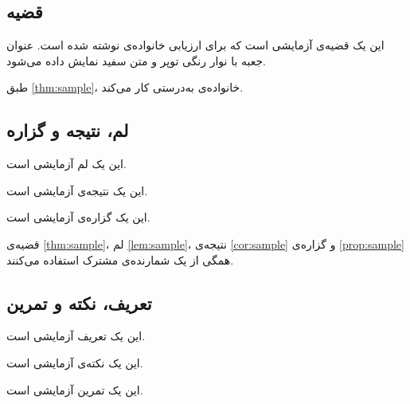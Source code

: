 \documentclass{matinbook}
\begin{document}
\subsection{قضیه}

\begin{theorem}
    این یک قضیه‌ی آزمایشی است که برای ارزیابی خانواده‌ی
     نوشته شده است. عنوان جعبه با نوار رنگی
    توپر و متن سفید نمایش داده می‌شود.
    \label{thm:sample}
\end{theorem}

طبق \cref{thm:sample}، خانواده‌ی  به‌درستی کار می‌کند.

\subsection{لم، نتیجه و گزاره}

\begin{lemma}[لم نمونه]
    این یک لم آزمایشی است.
    \label{lem:sample}
\end{lemma}

\begin{corollary}
    این یک نتیجه‌ی آزمایشی است.
    \label{cor:sample}
\end{corollary}

\begin{proposition}
    این یک گزاره‌ی آزمایشی است.
    \label{prop:sample}
\end{proposition}

قضیه‌ی \cref{thm:sample}، لم \cref{lem:sample}، نتیجه‌ی
\cref{cor:sample} و گزاره‌ی \cref{prop:sample} همگی از
یک شمارنده‌ی مشترک استفاده می‌کنند.

\subsection{تعریف، نکته و تمرین}

\begin{definition}
    این یک تعریف آزمایشی است.
    \label{def:sample}
\end{definition}

\begin{remark}
    این یک نکته‌ی آزمایشی است.
    \label{rem:sample}
\end{remark}

\begin{exercise}
    این یک تمرین آزمایشی است.
    \label{exc:sample}
\end{exercise}
\end{document}
